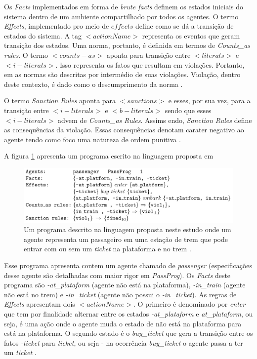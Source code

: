 Os \textit{Facts} implementados em forma de \textit{brute facts} definem os estados iniciais do sistema dentro de um ambiente compartilhado por todos os agentes. O termo \textit{Effects},
implementado pro meio de $effects$ define como se dá a transição de estados do sistema. A tag $<actionName>$ representa os eventos que geram transição dos estados. Uma norma,
portanto, é definida em termos de \textit{Counts\_as rules}. O termo $<counts-as>$ aponta para transição entre $<literals>$ e $<i-literals>$. Isso representa os fatos que
resultam em violações. Portanto, em \cite{dastaniframework} as normas são descritas por intermédio de suas violações. Violação, dentro deste contexto, é dado como o descumprimento da norma 
\cite{ontologynormative}.

O termo \textit{Sanction Rules} aponta para $<sanctions>$ e esses, por sua vez, para a transição entre $<i-literals>$ e $<b-literals>$ sendo que esses $<i-literals>$ advem
de \textit{Counts\_as Rules}. Assims endo, \textit{Sanction Rules} define as consequências da violação. Essas consequências denotam carater negativo ao agente tendo como foco uma natureza de ordem
punitiva \cite{dastaniframework}. 

A figura \ref{exemploprograma} apresenta um programa escrito na linguagem proposta em  

\begin{figure}[H]
  \centering
  \includegraphics[width=0.8\linewidth]{figure/programdastani.png} 
  \caption{Um programa descrito na linguagem proposta neste estudo onde um agente representa um passageiro em uma estação de trem que pode entrar com ou sem um \textit{ticket} na plataforma e no trem \cite{dastaniframework}.}
  \label{exemploprograma}
\end{figure}

Esse programa apresenta contem um agente chamado de \textit{passenger} (especificações desse agente são detalhadas com maior rigor em \textit{PassProg}). Os \textit{Facts} deste programa são
\textit{-at\_plataform} (agente não está na plataforma), \textit{-in\_train} (agente não está no trem) e \textit{-in\_ticket} (agente não possui o \textit{-in\_ticket}). As regras de 
\textit{Effects} apresentam dois $<actionName>$. O primeiro é denominado por \textit{enter} que tem por finalidade alternar entre os estados \textit{-at\_plataform} e \textit{at\_plataform}, 
ou seja, é uma ação onde o agente muda o estado de não está na plataforma para está na plataforma. O segundo estado é o \textit{buy\_ticket} que gera a transição entre os fatos \textit{-ticket}  
para \textit{ticket}, ou seja - na ocorrência \textit{buy\_ticket} o agente passa a ter um \textit{ticket} \cite{dastaniframework}.

